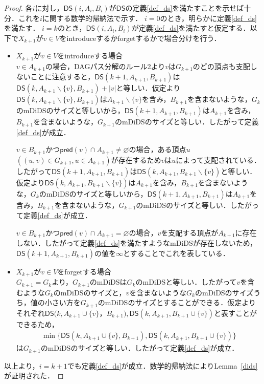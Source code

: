 \documentclass[master]{kuisthesis}		%
\theoremstyle{plain}
\theoremstyle{definition}
\begin{document}
\begin{proof}
    各$i$に対し，$\mathsf{DS}(i, A_i, B_i)$が$\mathsf{DS}$の定義\ref{def_ds}を満たすことを示せば十分．これを$i$に関する数学的帰納法で示す．
    $i=0$のとき，明らかに定義\ref{def_ds}を満たす．
    $i=k$のとき，$\mathsf{DS}(i, A_i, B_i)$が定義\ref{def_ds}を満たすと仮定する．以下で$X_{k+1}$が$v \in V$をintroduceするかforgetするかで場合分けを行う．
    \begin{itemize}
        \item $X_{k+1}$が$v \in V$をintroduceする場合 \\
        $v \in A_{k+1}$の場合，DAGパス分解のルール2より$v$は$G_{k+1}$のどの頂点も支配しないことに注意すると，$\mathsf{DS}(k+1, A_{k+1}, B_{k+1})$は$\mathsf{DS}(k, A_{k+1} \backslash \{v\}, B_{k+1}) + |{v}|$と等しい．仮定より$\mathsf{DS}(k, A_{k+1} \backslash \{v\}, B_{k+1})$は$A_{k+1} \backslash \{v\}$を含み，$B_{k+1}$を含まないような，$G_k$のmDiDSのサイズと等しいから，$\mathsf{DS}(k+1, A_{k+1}, B_{k+1})$は$A_{k+1}$を含み，$B_{k+1}$を含まないような，$G_{k+1}$のmDiDSのサイズと等しい．したがって定義\ref{def_ds}が成立．
        
        $v \in B_{k+1}$かつ$\mathsf{pred}(v) \cap A_{k+1} \neq \varnothing$の場合，ある頂点$u$ $((u, v) \in G_{k+1}, u \in A_{k+1})$が存在するため$v$は$u$によって支配されている．したがって$\mathsf{DS}(k+1, A_{k+1}, B_{k+1})$は$\mathsf{DS}(k, A_{k+1}, B_{k+1} \backslash \{v\})$と等しい．仮定より$\mathsf{DS}(k, A_{k+1}, B_{k+1} \backslash \{v\})$は$A_{k+1}$を含み，$B_{k+1}$を含まないような，$G_k$のmDiDSのサイズと等しいから，$\mathsf{DS}(k+1, A_{k+1}, B_{k+1})$は$A_{k+1}$を含み，$B_{k+1}$を含まないような，$G_{k+1}$のmDiDSのサイズと等しい．したがって定義\ref{def_ds}が成立．

        $v \in B_{k+1}$かつ$\mathsf{pred}(v) \cap A_{k+1} = \varnothing$の場合，$v$を支配する頂点が$A_{k+1}$に存在しない．したがって定義\ref{def_ds}を満たすようなmDiDSが存在しないため，$\mathsf{DS}(k+1, A_{k+1}, B_{k+1})$の値を$\infty$とすることでこれを表している．
        
        \item $X_{k+1}$が$v \in V$をforgetする場合 \\
        $G_{k+1} = G_k$より，$G_{k+1}$のmDiDSは$G_k$のmDiDSと等しい．したがって$v$を含むような$G_k$のmDiDSのサイズと，$v$を含まないような$G_k$のmDiDSのサイズうち，値の小さい方を$G_{k+1}$のmDiDSのサイズとすることができる．仮定よりそれぞれ$\mathsf{DS}(k, A_{k+1} \cup \{v\}$，$B_{k+1}), \mathsf{DS}(k, A_{k+1}, B_{k+1} \cup \{v\})$と表すことができるため，
        \begin{align*}
            \min \{\mathsf{DS}(k, A_{k+1} \cup \{v\}, B_{k+1}), \mathsf{DS}(k, A_{k+1}, B_{k+1} \cup \{v\})\}
        \end{align*}
        は$G_{k+1}$のmDiDSのサイズと等しい．したがって定義\ref{def_ds}が成立．
    \end{itemize}
    以上より，$i = k+1$でも定義\ref{def_ds}が成立．数学的帰納法によりLemma~\ref{dids}が証明された．
\end{proof}
\end{document}
